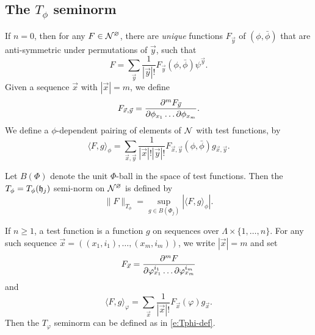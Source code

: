 
\subsection{The \texorpdfstring{$T_\phi$}{Tphi} seminorm}
\label{sec:Tphi}

If $n = 0$, then for any $F \in \mathcal{N}^\varnothing$, there are
\emph{unique} functions $F_{\vec y}$ of $(\phi, \bar\phi)$
that are anti-symmetric under permutations of $\vec y$, such that
\begin{equation}
F = \sum_{\vec y} \frac{1}{|\vec y|!} F_{\vec y}(\phi, \bar\phi) \psi^{\vec y}.
\end{equation}
Given a sequence $\vec{x}$ with $|\vec{x}| = m$, we define
\begin{equation}
F_{\vec x, \vec y} = \frac{\partial ^m F_{\vec y}}{\partial \phi_{x_1} \ldots \partial\phi_{x_m}}.
\end{equation}
We define a $\phi$-dependent pairing of elements of $\mathcal{N}$ with test functions, by
\begin{equation}
\label{e:pairing}
\langle F, g \rangle_\phi
  =
\sum_{\vec x, \vec y}
\frac{1}{|\vec x|! |\vec y|!}
F_{\vec x,\vec y}(\phi, \bar\phi)
g_{\vec x,\vec y}.
\end{equation}

Let $B(\Phi)$ denote the unit $\Phi$-ball in the space of test functions. Then the
$T_\phi = T_\phi(\mathfrak{h}_j)$ semi-norm on $\mathcal{N}^\varnothing$ is defined by
\begin{equation}
\label{e:Tphi-def}
\|F\|_{T_\phi} = \sup_{g\in B(\Phi_j)} |\langle F, g \rangle_\phi|.
\end{equation}

\begin{rk}
\label{rk:Tphi-n}
If $n \ge 1$, a test function is a function $g$ on sequences over $\Lambda\times\{1,\ldots,n\}$.
For any such sequence $\vec x = ((x_1, i_1), \ldots, (x_m, i_m))$, we write $|\vec x| = m$
and set
\begin{equation}
F_{\vec x}
	=
\frac{\partial ^m F}{\partial \varphi^{i_1}_{x_1} \ldots \partial\varphi^{i_m}_{x_m}}
\end{equation}
and
\begin{equation}
\langle F, g \rangle_\varphi
	=
\sum_{\vec x} \frac{1}{|\vec x|!} F_{\vec x}(\varphi) g_{\vec x}.
\end{equation}
Then the $T_\varphi$ seminorm can be defined as in \eqref{e:Tphi-def}.
\end{rk}

